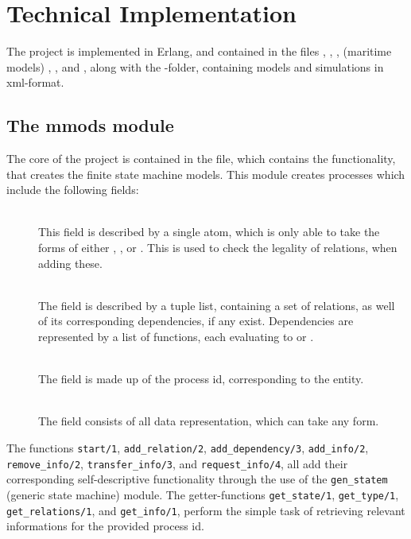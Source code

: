 \section{Technical Implementation}
The project is implemented in Erlang, and contained in the files , , , (maritime models) , , and , along with the -folder, containing models and simulations in xml-format.

\subsection{The mmods module}
The core of the project is contained in the  file, which contains the functionality, that creates the finite state machine models. This module creates processes which include the following fields:
\begin{description}
	\item[]\ \\
		This field is described by a single atom, which is only able to take the forms of either , , or . This is used to check the legality of relations, when adding these.
	\item[]\ \\
		The  field is described by a tuple list, containing a set of relations, as well of its corresponding dependencies, if any exist. Dependencies are represented by a list of functions, each evaluating to  or .
	\item[]\ \\
		The  field is made up of the process id, corresponding to the entity.
	\item[]\ \\
		The  field consists of all data representation, which can take any form.
\end{description}
The functions \lstinline{start/1}, \lstinline{add_relation/2}, \lstinline{add_dependency/3}, \lstinline{add_info/2}, \linebreak \lstinline{remove_info/2}, \lstinline{transfer_info/3}, and \lstinline{request_info/4}, all add their corresponding self-descriptive functionality through the use of the \lstinline{gen_statem} (generic state machine) module. The getter-functions \lstinline{get_state/1}, \lstinline{get_type/1}, \lstinline{get_relations/1}, and \lstinline{get_info/1}, perform the simple task of retrieving relevant informations for the provided process id.

